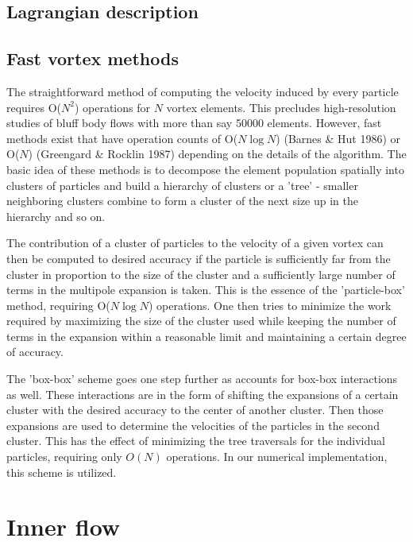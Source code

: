 \subsection{Lagrangian description}

\subsection{Fast vortex methods}
The straightforward method of computing the velocity induced by every particle requires O($N^2$) operations for $N$ vortex elements.
This precludes high-resolution studies of bluff body flows with more than say 50000 elements.
However, fast methods exist that have operation counts of O($N\log N$)  (Barnes \& Hut 1986) or O($N$) (Greengard \& Rocklin 1987) depending on the details of the algorithm.
The basic idea of these methods is to decompose the element population spatially into clusters of particles and build a hierarchy of clusters or a 'tree' - smaller neighboring clusters combine to form a cluster of the next size up in the hierarchy and so on.

The contribution of a cluster of particles to the velocity of a given vortex can then be computed to desired accuracy if the particle is sufficiently far from the cluster in proportion to the size of the cluster and a sufficiently large number of terms in the multipole expansion is taken.
This is the essence of the 'particle-box' method, requiring O($N\log N$) operations.
One then tries to minimize the work required by maximizing the size of the cluster used while keeping the number of terms in the expansion within a reasonable limit and maintaining a certain degree of accuracy.

The 'box-box' scheme goes one step further as accounts for box-box interactions as well. 
These interactions are in the form of shifting the expansions of a certain cluster with the desired accuracy to the center of another cluster.
Then those expansions are used to determine the velocities of the particles in the second cluster.
This has the effect of minimizing the tree traversals for the individual particles, requiring only $O(N)$ operations.
In our numerical implementation, this scheme is utilized.

\section{Inner flow}

